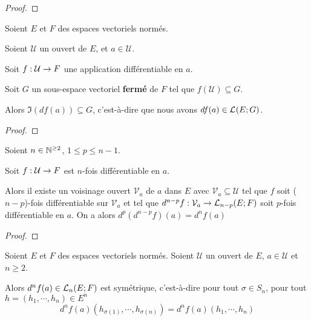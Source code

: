 \ifdefined\outputproof
\begin{proof}

\end{proof}
\fi


\begin{lemma}
	Soient $E$ et $F$ des espaces vectoriels normés.

	Soient $\mathcal{U}$ un ouvert de $E$, et $a \in \mathcal{U}$.

	Soit $\GSfunction{f}{\mathcal{U}}{F}$ une application différentiable en $a$.

	Soit $G$ un sous-espace vectoriel \textbf{fermé} de $F$ tel que
	$f(\mathcal{U}) \subseteq G$.

	Alors $\Im(df(a)) \subseteq G$, c'est-à-dire que nous avons $df(a) \in
	\GScontinueHomo{E}{G}$.
\end{lemma}

\ifdefined\outputproof
\begin{proof}

\end{proof}
\fi

\begin{lemma}
	Soient $n \in \naturel^{\geq 2}$, $1 \leq p \leq n - 1$.

	Soit $\GSfunction{f}{\mathcal{U}}{F}$ est $n$-fois différentiable en $a$.

	Alors il existe un voisinage ouvert $\mathcal{V}_{a}$ de $a$ dans $E$ avec
	$\mathcal{V}_{a} \subseteq \mathcal{U}$ tel que $f$ soit ($n - p$)-fois
	différentiable sur $\mathcal{V}_{a}$ et tel que $d^{n - p}f :
	\mathcal{V}_{a} \rightarrow \GScontinueHomo[n - p]{E}{F}$ soit $p$-fois
	différentiable en $a$. On a alors $d^{p} (d^{n - p} f) (a) = d^{n} f(a)$
\end{lemma}

\ifdefined\outputproof
\begin{proof}

\end{proof}
\fi

\begin{theorem} 
	\label{theorem:symetry_schwarz_generalized}
	Soient $E$ et $F$ des espaces vectoriels normés.
	Soient $\mathcal{U}$ un ouvert de $E$, $a \in \mathcal{U}$ et $n \geq 2$.

	Alors $d^{n}f(a) \in \GScontinueHomo[n]{E}{F}$ est symétrique, c'est-à-dire
	pour tout $\sigma \in S_{n}$, pour tout $h = (h_{1}, \cdots, h_{n}) \in E^{n}$
	\begin{equation*}
		d^{n}f (a) (h_{\sigma(1)}, \cdots, h_{\sigma(n)}) = d^{n}f (a) (h_{1},
		\cdots, h_{n})
	\end{equation*}
\end{theorem}

